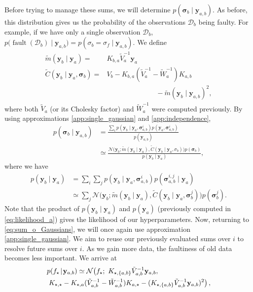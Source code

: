 \documentclass[twoside]{article}
\newcommand{\deq}{=}
\newcommand{\given}{\!\ensuremath{\mid}\!}
\newcommand{\cm}[1]{\ensuremath{\mathcal{#1}}}
\newcommand{\bm}[1]{\ensuremath{\mathbf{#1}}}
\newcommand{\data}{\ensuremath{\cm{D}}}
\newcommand{\vect}[1]{\bm{#1}}
\newcommand{\vy}{\vect{y}}
\newcommand{\vs}{\vect{\sigma}}
\newcommand{\amean}[2]{\tilde{{m}}(#1 \given #2 )}
\newcommand{\acov}[2]{\tilde{{C}}(#1 \given #2 )}
\newcommand{\p}[2]{p(#1\given#2)}
\newcommand{\fPr}{p}
\newcommand{\Prob}[2]{\fPr(#1 \given #2 )}
\newcommand{\ps}[2]{p(#1\vert#2)}
\newcommand{\st}{_{\star}}
\DeclareMathOperator{\fault}{fault}
\begin{document}
Before trying to manage these sums, we will determine $p(\vs_b \given \vy_{a,b})$. As before, this distribution gives us the probability
of the observations $\data_b$ being faulty. For example, if we have
only a single observation $\data_b$, $
p\bigl(\fault(\data_b) \given \vy_{a,b}\bigr) = \Prob{\sigma_b =
  \sigma_f}{\vy_{a,b}} $. We define
\begin{align*}%
\amean{\vy_b}{\vy_a} \deq {} &
K_{b,a} \tilde{V}_a^{-1} \vy_a %
\\
\acov{\vy_b}{\vy_{a},\vs_b}
\deq {} & V_b - K_{b,a}(\tilde{V}_a^{-1}-\tilde{W}_a^{-1})K_{a,b} \nonumber\\
 & \hspace{3cm} - \amean{\vy_b}{\vy_{a,b}}^2, %
\end{align*}
where both $\tilde{V}_a$ (or its Cholesky factor) and
$\tilde{W}_a^{-1}$ were computed previously. By using
approximations \ref{app:single_gaussian} and \ref{app:independence},
\begin{align*}
\Prob{\vs_b}{\vy_{a,b}} & = \frac{\sum_i \p{\vy_b}{\vy_a,\vs^i_{a,b}}p(\vy_a,\vs^i_{a,b})}{p(\vy_{a,b})} 
\nonumber\\
& \simeq \frac{\cm{N}\bigl(\vy_b; \amean{\vy_b}{\vy_a}, \acov{\vy_b}{\vy_a, \sigma_b}\bigr) \fPr(\vs_b)}{\p{\vy_{b}}{\vy_a}},%
\end{align*}
where we have
\begin{align*}
p(\vy_{b} \given \vy_a)
& = \sum_i \sum_j \p{\vy_b}{\vy_a,\vs^i_{a,b}}\Prob{\vs^{i,j}_{a,b}}{\vy_a}
\nonumber\\
&  \simeq \sum_j \cm{N}\bigl(\vy_b; \amean{\vy_b}{\vy_a}, \acov{\vy_b}{\vy_a, \vs_b^j}\bigr) \fPr(\vs_b^j).%
\end{align*}
Note that the product of $p(\vy_{b} \given \vy_a)$ and $p(\vy_a)$ (previously computed in
\eqref{eq:likelihood_a}) gives the likelihood of our hyperparameters. Now, returning to \eqref{eq:sum_o_Gaussians}, we will once again
use approximation \ref{app:single_gaussian}. We aim to reuse our previously evaluated sums over
$i$ to resolve future sums over $i$. As we gain more data, the
faultiness of old data becomes less important. We arrive at
\begin{align*}
&\p{f\st}{\vy_{a,b}} \simeq \cm{N}\bigl(
f\st;\ 
K_{\star,\{a,b\}} \tilde{V}_{a,b}^{-1} \vy_{a,b},
\\ & \hspace{0.1cm}
K_{\star,\star} - K_{\star,a}(\tilde{V}_{a,b}^{-1}-\tilde{W}_{a,b}^{-1})K_{a,\star} - (K_{\star,\{a,b\}} \tilde{V}_{a,b}^{-1} \vy_{a,b})^2
\bigr)\,,%
\end{align*}
\end{document}
